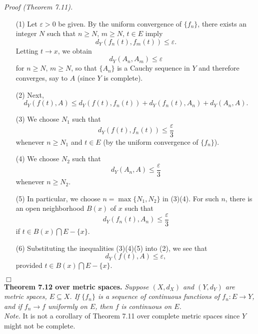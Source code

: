 \documentclass{article}
\begin{document}
\emph{Proof (Theorem 7.11).}
\begin{enumerate}
\item[(1)]
  Let $\varepsilon > 0$ be given.
  By the uniform convergence of $\{f_n\}$, there exists an integer $N$
  such that $n \geq N$, $m \geq N$, $t \in E$ imply
  \[
    d_Y(f_n(t),f_m(t)) \leq \varepsilon.
  \]
  Letting $t \to x$, we obtain
  \[
    d_Y(A_n,A_m) \leq \varepsilon
  \]
  for $n \geq N$, $m \geq N$, so that $\{A_n\}$ is a Cauchy sequence in $Y$
  and therefore converges, say to $A$ (since $Y$ is complete).

\item[(2)]
  Next,
  \[
    d_Y(f(t),A)
    \leq
    d_Y(f(t),f_n(t)) + d_Y(f_n(t),A_n) + d_Y(A_n,A).
  \]

\item[(3)]
  We choose $N_1$ such that
  \[
    d_Y(f(t),f_n(t)) \leq \frac{\varepsilon}{3}
  \]
  whenever $n \geq N_1$ and $t \in E$
  (by the uniform convergence of $\{f_n\}$).

\item[(4)]
  We choose $N_2$ such that
  \[
    d_Y(A_n,A) \leq \frac{\varepsilon}{3}
  \]
  whenever $n \geq N_2$.

\item[(5)]
  In particular, we choose $n = \max\{N_1,N_2\}$ in (3)(4).
  For such $n$, there is an open neighborhood $B(x)$ of $x$ such that
  \[
    d_Y(f_n(t),A_n) \leq \frac{\varepsilon}{3}
  \]
  if $t \in B(x) \bigcap E - \{x\}$.

\item[(6)]
  Substituting the inequalities (3)(4)(5) into (2), we see that
  \[
    d_Y(f(t),A) \leq \varepsilon,
  \]
  provided $t \in B(x) \bigcap E - \{x\}$.
\end{enumerate}
$\Box$ \\



\textbf{Theorem 7.12 over metric spaces.}
\emph{Suppose $(X,d_X)$ and $(Y,d_Y)$ are metric spaces, $E \subseteq X$.
If $\{f_n\}$ is a sequence of continuous functions of $f_n: E \to Y$,
and if $f_n \to f$ uniformly on $E$,
then $f$ is continuous on $E$.} \\

\emph{Note.}
It is not a corollary of Theorem 7.11 over complete metric spaces
since $Y$ might not be complete. \\
\end{document}
